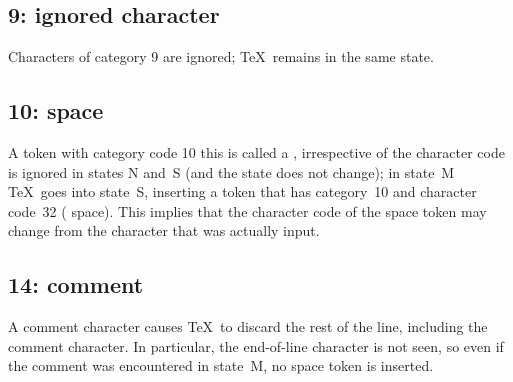 \documentclass{book}
\begin{document}
\subsection{9: ignored character}

Characters of category 9 are ignored; \TeX\ remains in the same state.

\subsection{10: space}

A token with category code 10 \ldash this is called a ,
irrespective of the character code \rdash 
is ignored in states {\italic N} and~{\italic S} 
(and the state does not change); 
in state~{\italic M} \TeX\ goes into state~{\italic S}, inserting
a token that has category~10 and character code~32 
(\ascii{} space).
This implies that the character code of the space token may change
from the character that was actually input.

\subsection{14: comment}

A comment character causes \TeX\ to discard 
the rest of the line, including the comment character.
In particular, the end-of-line character is not seen,
so even if the comment was encountered in state~{\italic M}, no space
token is inserted.
\end{document}
